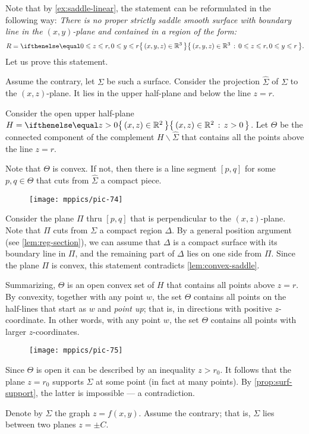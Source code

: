Note that by \ref{ex:saddle-linear}, the statement can be reformulated in the following way:
\emph{There is no proper strictly saddle smooth surface 
with  boundary line in the $(x,y)$-plane
and contained in a region of the form:}
\[R=\set{(x,y,z)\in\mathbb{R}^3}{0\le z\le r, 0\le y\le r}.\]
Let us prove this statement.

Assume the contrary, let $\Sigma$ be such a surface.
Consider the projection $\hat \Sigma$ of $\Sigma$ to the $(x,z)$-plane.
It lies in the upper half-plane and below the line $z=r$.

Consider the open upper half-plane $H=\set{(x,z)\in \mathbb{R}^2}{z> 0}$. 
Let $\Theta$ be the connected component of the complement $H\backslash \hat \Sigma$ that contains all the points above the line $z=r$.

Note that $\Theta$ is convex.
If not, then there is a line segment $[p,q]$ for some $p,q\in \Theta$ that cuts from $\hat\Sigma$ a compact piece.
\begin{figure}[!ht]
\vskip-0mm
\centering
\texttt{[image: mppics/pic-74]}
\vskip0mm
\end{figure}
Consider the plane $\Pi$ thru $[p,q]$ that is perpendicular to the $(x,z)$-plane.
Note that $\Pi$ cuts from $\Sigma$ a compact region $\Delta$.
By a general position argument (see \ref{lem:reg-section}),
we can assume that $\Delta$ is a compact surface with its boundary line in $\Pi$, and the remaining part of $\Delta$ lies on one side from $\Pi$.
Since the plane $\Pi$ is convex, this statement contradicts \ref{lem:convex-saddle}.

Summarizing, $\Theta$ is an open convex set of $H$ that contains all points above $z=r$.
By convexity, together with any point $w$, the set $\Theta$ contains all points on the half-lines that start as $w$ and {}\emph{point up}; that is, in directions with positive $z$-coordinate. 
In other words, with any point $w$,
the set $\Theta$ contains all points with larger $z$-coordinates.
\begin{figure}[!ht]
\vskip-0mm
\centering
\texttt{[image: mppics/pic-75]}
\vskip0mm
\end{figure}
Since $\Theta$ is open it can be described by an inequality $z>r_0$.
It follows that the plane $z=r_0$ supports $\Sigma$ at some point (in fact at many points).
By \ref{prop:surf-support}, the latter is impossible --- a contradiction.
\qeds

Denote by $\Sigma$ the graph $z=f(x,y)$.
Assume the contrary; that is, $\Sigma$ lies between two planes $z=\pm C$.

